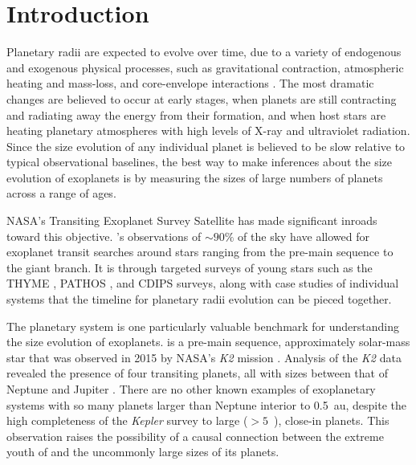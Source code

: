 \documentclass[twocolumn]{aastex631}
\begin{document}
\section{Introduction} \label{sec:intro}
Planetary radii are expected to evolve over time, due to a variety of endogenous and exogenous physical processes, such as gravitational contraction, atmospheric heating and mass-loss, and core-envelope interactions \citep[e.g.][]{OwenWu2013, Lopez2013, Jin2014, ChenRogers2016, Ginzburg2018}. The most dramatic changes are believed to occur at early stages, when planets are still contracting and radiating away the energy from their formation, and when host stars are heating planetary atmospheres with high levels of X-ray and ultraviolet radiation. Since the size evolution of any individual planet is believed to be slow relative to typical observational baselines, the best way to make inferences about the size evolution of exoplanets is by measuring the sizes of large numbers of planets across a range of ages. 

NASA's Transiting Exoplanet Survey Satellite \citep[\tess;][]{Ricker2015} has made significant inroads toward this objective. \tess's observations of $\sim 90 \%$ of the sky have allowed for exoplanet transit searches around stars ranging from the pre-main sequence to the giant branch. It is through targeted surveys of young stars such as the THYME \citep[e.g.][]{Newton2019}, PATHOS \citep[e.g.][]{Nardiello2020}, and CDIPS \citep[e.g.][]{Bouma2020} surveys, along with case studies of individual systems \citep[e.g.][]{benatti19, Plavchan2020, Hedges2021, Zhou2021} that the timeline for planetary radii evolution can be pieced together. 

The \sname planetary system is one particularly valuable benchmark for understanding the size evolution of exoplanets. \sname is a pre-main sequence, approximately solar-mass star that was observed in 2015 by NASA's \textit{K2} mission \citep{Howell2014}. Analysis of the \textit{K2} data revealed the presence of four transiting planets, all with sizes between that of Neptune and Jupiter \citep{David2019a, David2019b}. There are no other known examples of exoplanetary systems with so many planets larger than Neptune interior to 0.5~au, despite the high completeness of the \textit{Kepler} survey to large ($>5$~\rearth), close-in planets. This observation raises the possibility of a causal connection between the extreme youth of \sname and the uncommonly large sizes of its planets.  
\end{document}
